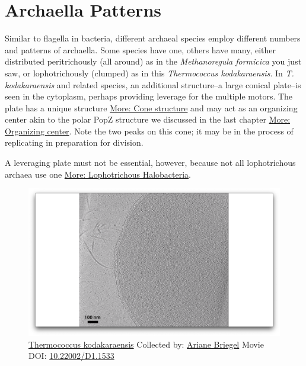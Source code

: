 \documentclass[]{tufte-book}
\begin{document}
\section{Archaella Patterns}\label{archaella-patterns}

Similar to flagella in bacteria, different archaeal species employ
different numbers and patterns of archaella. Some species have one,
others have many, either distributed peritrichously (all around) as in
the \emph{Methanoregula formicica} you just saw, or lophotrichously
(clumped) as in this \emph{Thermococcus kodakaraensis}. In \emph{T.
kodakaraensis} and related species, an additional structure--a large
conical plate--is seen in the cytoplasm, perhaps providing leverage for
the multiple motors. The plate has a unique structure
\protect\hyperlink{Cone_structure}{More: Cone structure} and may act as
an organizing center akin to the polar PopZ structure we discussed in
the last chapter \protect\hyperlink{Organizing_center}{More: Organizing
center}. Note the two peaks on this cone; it may be in the process of
replicating in preparation for division.

A leveraging plate must not be essential, however, because not all
lophotrichous archaea use one
\protect\hyperlink{Lophotrichous_Halobacteria}{More: Lophotrichous
Halobacteria}.





\begin{figure}
\includegraphics{movie_stills/6_9} \caption[\protect\hyperlink{tree}{Thermococcus kodakaraensis} Collected
by: \protect\hyperlink{ariane_briegel}{Ariane Briegel} Movie DOI:
\href{https://doi.org/10.22002/D1.1533}{10.22002/D1.1533}]{\protect\hyperlink{tree}{Thermococcus kodakaraensis} Collected
by: \protect\hyperlink{ariane_briegel}{Ariane Briegel} Movie DOI:
\href{https://doi.org/10.22002/D1.1533}{10.22002/D1.1533}}\label{fig:6-9}
\end{figure}
\end{document}
